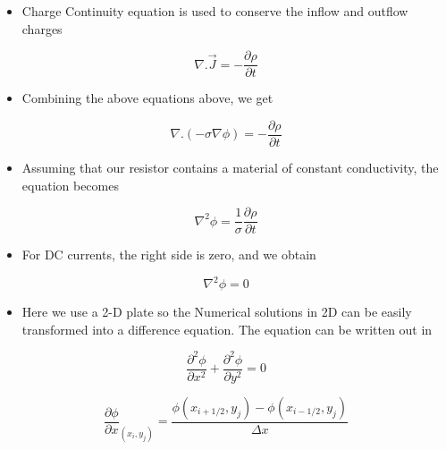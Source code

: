 \documentclass[11pt]{article}
\providecommand{\tightlist}{%
      \setlength{\itemsep}{0pt}\setlength{\parskip}{0pt}}
\begin{document}
\begin{itemize}
\tightlist
\item
  Charge Continuity equation is used to conserve the inflow and outflow
  charges
\end{itemize}

\begin{equation}
\nabla.\vec{J} = -\frac{\partial \rho}{\partial t}
   \end{equation}

\begin{itemize}
\tightlist
\item
  Combining the above equations above, we get
\end{itemize}

\begin{equation}
\nabla.(-\sigma\nabla\phi) = -\frac{\partial \rho}{\partial t}
   \end{equation}

\begin{itemize}
\tightlist
\item
  Assuming that our resistor contains a material of constant
  conductivity, the equation becomes
\end{itemize}

\begin{equation}
\nabla^{2}\phi = \frac{1}{\sigma}\frac{\partial \rho}{\partial t}
   \end{equation}

\begin{itemize}
\tightlist
\item
  For DC currents, the right side is zero, and we obtain
\end{itemize}

\begin{equation}
\nabla^{2}\phi = 0
   \end{equation}

\begin{itemize}
\tightlist
\item
  Here we use a 2-D plate so the Numerical solutions in 2D can be easily
  transformed into a difference equation. The equation can be written
  out in
\end{itemize}

\begin{equation}
\frac{\partial^{2} \phi}{\partial x^{2}}+ \frac{\partial^{2} \phi}{\partial y^{2}} = 0
 \end{equation}

\begin{equation}
\frac{\partial \phi}{\partial x}_{(x_i,y_j)} = \frac{\phi(x_{i+1/2},y_j) - \phi(x_{i-1/2},y_j)}{\Delta x}
 \end{equation}
\end{document}
